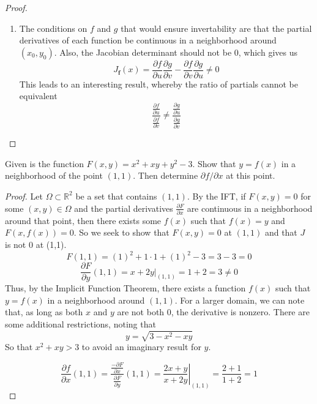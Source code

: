 \documentclass[12pt]{article}
\newcommand{\R}{\mathbb{R}}
\newcommand{\bvec}[1]{\textbf{#1}}
\newenvironment{problem}[2][Problem]{\begin{trivlist}
\item[\hskip \labelsep {\bfseries #1}\hskip \labelsep {\bfseries #2.}]}{\end{trivlist}}
\begin{document}
\begin{proof}
\begin{enumerate}
    \item The conditions on $f$ and $g$ that would ensure invertability are that the partial derivatives of each function be continuous in a neighborhood around $(x_0,y_0)$. Also, the Jacobian determinant should not be $0$, which gives us
    \[
        J_{\bvec{f}}(x)=\frac{\partial f}{\partial u}\frac{\partial g}{\partial v}-\frac{\partial f}{\partial v}\frac{\partial g}{\partial u}\not=0
    \]
    This leads to an interesting result, whereby the ratio of partials cannot be equivalent
    \[
        \frac{
            \frac{\partial f}{\partial u}
        }{
            \frac{\partial f}{\partial v}
        }\not=\frac{
            \frac{\partial g}{\partial u}
        }{
            \frac{\partial g}{\partial v}
        }
    \]
    \vspace{6in}
\end{enumerate}
\end{proof}

\begin{problem}{D1}
Given is the function $F(x,y)=x^2+xy+y^2-3.$ Show that $y=f(x)$ in a neighborhood of the point $(1,1)$. Then determine $\partial f/\partial x$ at this point.
\end{problem}

\begin{proof}
Let $\Omega\subset\R^2$ be a set that contains $(1,1)$. By the IFT, if $F(x,y)=0$ for some $(x,y)\in\Omega$ and the partial derivatives $\frac{\partial F}{\partial x}$ are continuous in a neighborhood around that point, then there exists some $f(x)$ such that $f(x)=y$ and $F(x,f(x))=0$. So we seek to show that $F(x,y)=0$ at $(1,1)$ and that $J$ is not $0$ at (1,1). 
    \[F(1,1)=(1)^2+1\cdot1+(1)^2-3=3-3=0\]
    \[\frac{\partial F}{\partial y}(1,1) = \left.x+2y\right|_{(1,1)}=1+2=3\not=0\]
Thus, by the Implicit Function Theorem, there exists a function $f(x)$ such that $y=f(x)$ in a neighborhood around $(1,1)$. For a larger domain, we can note that, as long as both $x$ and $y$ are not both $0$, the derivative is nonzero. There are some additional restrictions, noting that 
\[y=\sqrt{3-x^2-xy}\]
So that $x^2+xy>3$ to avoid an imaginary result for $y$.

\[\frac{\partial f}{\partial x}(1,1)=\frac{\frac{-\partial F}{\partial x}}{\frac{\partial F}{\partial y}}(1,1)=\left.\frac{2x+y}{x+2y}\right|_{(1,1)}=\frac{2+1}{1+2}=1\]
\end{proof}
\end{document}
